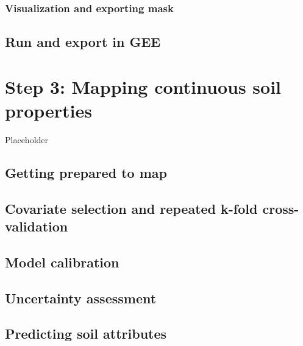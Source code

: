 \documentclass[
  10pt,
  b5paper,
  oneside]{book}
\begin{document}
\hypertarget{visualization-and-exporting-mask}{%
\subsection{Visualization and exporting mask}\label{visualization-and-exporting-mask}}

\hypertarget{run-and-export-in-gee}{%
\section{Run and export in GEE}\label{run-and-export-in-gee}}

\hypertarget{step-3-mapping-continuous-soil-properties}{%
\chapter{Step 3: Mapping continuous soil properties}\label{step-3-mapping-continuous-soil-properties}}

Placeholder

\hypertarget{getting-prepared-to-map}{%
\section{Getting prepared to map}\label{getting-prepared-to-map}}

\hypertarget{covariate-selection-and-repeated-k-fold-cross-validation}{%
\section{Covariate selection and repeated k-fold cross-validation}\label{covariate-selection-and-repeated-k-fold-cross-validation}}

\hypertarget{model-calibration}{%
\section{Model calibration}\label{model-calibration}}

\hypertarget{uncertainty-assessment}{%
\section{Uncertainty assessment}\label{uncertainty-assessment}}

\hypertarget{predicting-soil-attributes}{%
\section{Predicting soil attributes}\label{predicting-soil-attributes}}
\end{document}
